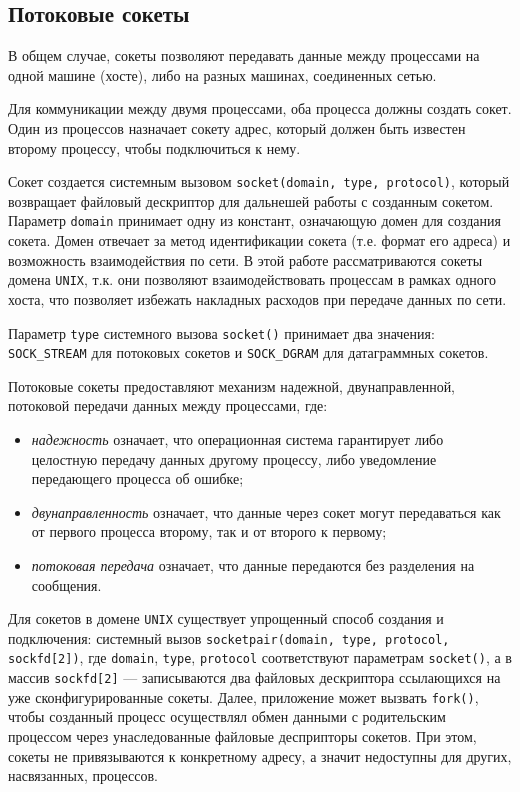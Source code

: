 \documentclass[14pt, russian]{scrartcl}
\begin{document}
\subsection{Потоковые сокеты}

В общем случае, сокеты позволяют передавать данные между процессами на одной
машине (хосте), либо на разных машинах, соединенных сетью.

Для коммуникации между двумя процессами, оба процесса должны создать сокет. Один
из процессов назначает сокету адрес, который должен быть известен второму
процессу, чтобы подключиться к нему.

Сокет создается системным вызовом \verb|socket(domain, type, protocol)|, который
возвращает файловый дескриптор для дальнешей работы с созданным сокетом.
Параметр \verb|domain| принимает одну из констант, означающую домен для создания
сокета. Домен отвечает за метод идентификации сокета (т.е. формат его адреса) и
возможность взаимодействия по сети. В этой работе рассматриваются сокеты домена
\verb|UNIX|, т.к. они позволяют взаимодействовать процессам в рамках одного
хоста, что позволяет избежать накладных расходов при передаче данных по сети.

Параметр \verb|type| системного вызова \verb|socket()| принимает два значения:
\verb|SOCK_STREAM| для потоковых сокетов и \verb|SOCK_DGRAM| для датаграммных
сокетов.

Потоковые сокеты предоставляют механизм надежной, двунаправленной, потоковой
передачи данных между процессами, где:

\begin{itemize}
  \item \emph{надежность} означает, что операционная система гарантирует либо
        целостную передачу данных другому процессу, либо уведомление передающего
        процесса об ошибке;
  \item \emph{двунаправленность} означает, что данные через сокет могут
        передаваться как от первого процесса второму, так и от второго к
        первому;
  \item \emph{потоковая передача} означает, что данные передаются без разделения
        на сообщения.
\end{itemize}

Для сокетов в домене \verb|UNIX| существует упрощенный способ создания и
подключения: системный вызов
\verb|socketpair(domain, type, protocol, sockfd[2])|, где \verb|domain|,
\verb|type|, \verb|protocol| соответствуют параметрам \verb|socket()|, а в
массив \verb|sockfd[2]| --- записываются два файловых дескриптора ссылающихся на
уже сконфигурированные сокеты. Далее, приложение может вызвать \verb|fork()|,
чтобы созданный процесс осуществлял обмен данными с родительским процессом через
унаследованные файловые десприпторы сокетов. При этом, сокеты не привязываются к
конкретному адресу, а значит недоступны для других, насвязанных, процессов.
\end{document}
